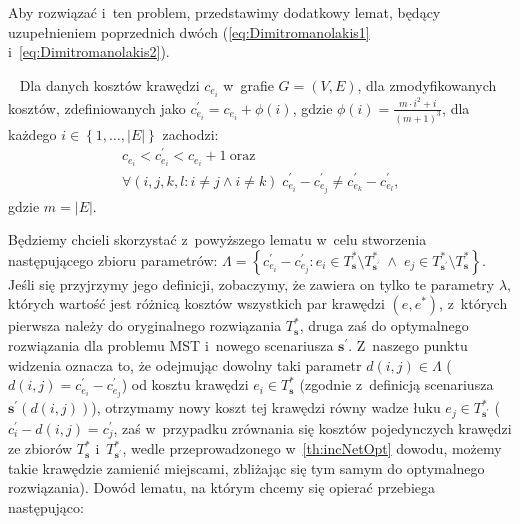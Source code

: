 Aby rozwiązać i~ten problem, przedstawimy dodatkowy lemat, będący uzupełnieniem poprzednich dwóch (\ref{eq:Dimitromanolakis1} i~\ref{eq:Dimitromanolakis2}).

\begin{lemma}~\cite{Dimitromanolakis02analysisof}\label{lm:Dimitromanolakis}
	Dla danych kosztów krawędzi $c_{e_{i}}$ w~grafie $G = \left( V, E \right)$, dla zmodyfikowanych kosztów, zdefiniowanych jako $c^{\prime}_{e_{i}} = c_{e_{i}} + \phi \left( i \right)$, gdzie $\phi \left( i \right) = \frac{m \cdot i^{2} + i}{\left( m + 1 \right)^{3}}$, dla każdego $i \in \left\{ 1, \dots, \left| E \right| \right\}$ zachodzi:
	\begin{gather}
		c_{e_{i}} < c^{\prime}_{e_{i}} < c_{e_{i}} + 1~\text{oraz}\label{eq:Dimitromanolakis3}\\
		\forall \left( i, j, k, l : i \neq j \wedge i \neq k \right) \; c^{\prime}_{e_{i}} - c^{\prime}_{e_{j}} \neq c^{\prime}_{e_{k}} - c^{\prime}_{e_{l}}\text{,}\label{eq:Dimitromanolakis4}
	\end{gather}
	gdzie $m = \left| E \right|$.
\end{lemma}

Będziemy chcieli skorzystać z~powyższego lematu w~celu stworzenia następującego zbioru parametrów: $\Lambda = \left\{ c^{\prime}_{e_{i}} - c^{\prime}_{e_{j}} : e_{i} \in T^{\ast}_{\textbf{s}} \setminus T^{\ast}_{\textbf{s}^{\prime}} \; \wedge \; e_{j} \in T^{\ast}_{\textbf{s}^{\prime}} \setminus T^{\ast}_{\textbf{s}} \right\}$.
Jeśli się przyjrzymy jego definicji, zobaczymy, że zawiera on tylko te parametry $\lambda$, których wartość jest różnicą kosztów wszystkich par krawędzi $\left( e, e^{\ast} \right)$, z~których pierwsza należy do oryginalnego rozwiązania $T^{\ast}_{\textbf{s}}$, druga zaś do optymalnego rozwiązania dla problemu \textsc{MST} i~nowego scenariusza $\textbf{s}^{\prime}$.
Z~naszego punktu widzenia oznacza to, że odejmując dowolny taki parametr $d \left( i, j \right) \in \Lambda$ ($d \left( i, j \right) = c^{\prime}_{e_{i}} - c^{\prime}_{e_{j}}$) od kosztu krawędzi $e_{i} \in T^{\ast}_{\textbf{s}}$ (zgodnie z~definicją scenariusza $\textbf{s}^{\prime} \left( d \left( i, j \right) \right)$), otrzymamy nowy koszt tej krawędzi równy wadze łuku $e_{j} \in T^{\ast}_{\textbf{s}^{\prime}}$ ($c^{\prime}_{i} - d \left( i, j \right) = c^{\prime}_{j}$, zaś w~przypadku zrównania się kosztów pojedynczych krawędzi ze zbiorów $T^{\ast}_{\textbf{s}}$ i~$T^{\ast}_{\textbf{s}^{\prime}}$, wedle przeprowadzonego w~\ref{th:incNetOpt} dowodu, możemy takie krawędzie zamienić miejscami, zbliżając się tym samym do optymalnego rozwiązania).
Dowód lematu, na którym chcemy się opierać przebiega następująco:

